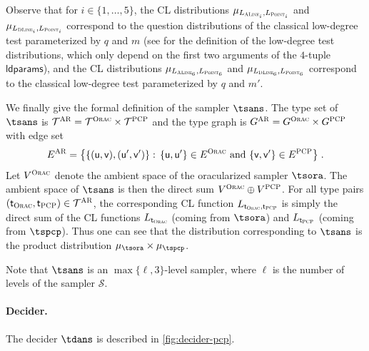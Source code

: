 \documentclass[11pt]{article}
\theoremstyle{definition}
\newcommand{\sampler}{\mathcal{S}}
\newcommand{\type}{\mathcal{T}}
\newcommand{\gamestyle}[1]{\ensuremath{\textsc{#1}}\xspace}
\newcommand{\ora}{\gamestyle{Orac}}
\newcommand{\pcp}{\gamestyle{PCP}}
\newcommand{\ar}{\gamestyle{AR}}
\newcommand{\tvarstyle}[1]{\mathsf{#1}}
\newcommand{\tvar}{\ensuremath{\tvarstyle{t}}}
\newcommand{\lvar}{\ensuremath{\tvarstyle{u}}}
\newcommand{\rvar}{\ensuremath{\tvarstyle{v}}}
\newcommand{\typestyle}[1]{\ensuremath{\textsc{#1}}\xspace}
\newcommand{\Point}{\typestyle{Point}}
\newcommand{\ALine}{\typestyle{ALine}}
\newcommand{\DLine}{\typestyle{DLine}}
\newcommand{\ldparams}{\mathsf{ldparams}}
\begin{document}
Observe that for $i \in \{1,\ldots,5\}$, the CL distributions
$\mu_{L_{\ALine_i},L_{\Point_i}}$ and $\mu_{L_{\DLine_i},L_{\Point_i}}$ correspond to
the question distributions of the classical low-degree test parameterized by $q$
and $m$ (see  for the definition of the low-degree test
distributions, which only depend on the first two arguments of the $4$-tuple
$\ldparams$), and the CL distributions $\mu_{L_{\ALine_6},L_{\Point_6}}$ and
$\mu_{L_{\DLine_6},L_{\Point_6}}$ correspond to the classical low-degree test
parameterized by $q$ and $m'$.

We finally give the formal definition of the sampler $\tsans$.
The type set of $\tsans$ is $\type^\ar = \type^\ora \times \type^\pcp$ and the
type graph is $G^\ar = G^\ora \times G^\pcp$ with edge set
\begin{equation*}
  E^\ar = \bigl\{\{(\lvar,\rvar),(\lvar',\rvar')\}:\,
  \{\lvar, \lvar'\} \in E^\ora \text{ and } \{\rvar, \rvar'\} \in
  E^\pcp \bigr\}\;.
\end{equation*}
Let $V^\ora$ denote the ambient space of the oracularized sampler $\tsora$.
The ambient space of $\tsans$ is then the direct sum $V^\ora \oplus V^\pcp$.
For all type pairs $(\tvar_\ora,\tvar_\pcp) \in \type^\ar$, the corresponding CL
function $L_{\tvar_\ora,\tvar_\pcp}$ is simply the direct sum of the CL functions $L_{\tvar_\ora}$ (coming from $\tsora$) and
$L_{\tvar_\pcp}$ (coming from $\tspcp$).
Thus one can see that the distribution corresponding to $\tsans$ is the product
distribution $\mu_{\tsora} \times \mu_{\tspcp}$.

Note that $\tsans$ is an $\max\{ \ell, 3\}$-level sampler, where $\ell$ is the
number of levels of the sampler $\sampler$.







\paragraph{Decider.}
The decider $\tdans$ is described in \cref{fig:decider-pcp}.
\end{document}

